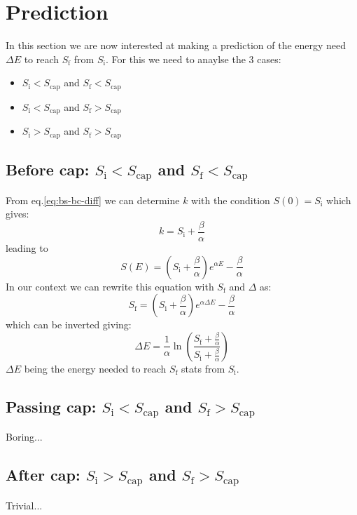 \documentclass[12pt]{article}
\def\Sc{S_\text{cap}}
\def\Si{S_\text{i}}
\def\Sf{S_\text{f}}
\begin{document}
\section{Prediction}
In this section we are now interested at making a prediction of the energy need $\Delta E$ to reach $\Sf$ from $\Si$. For this we need to anaylse the 3 cases:
\begin{itemize}
    \item $\Si < \Sc$ and $\Sf < \Sc$
    \item $\Si < \Sc$ and $\Sf > \Sc$
    \item $\Si > \Sc$ and $\Sf > \Sc$
\end{itemize}
\subsection{Before cap: $\Si < \Sc$ and $\Sf < \Sc$}
From eq.\eqref{eq:bs-bc-diff} we can determine $k$ with the condition $S(0) = \Si$ which gives:
\begin{equation}
    k = \Si + \frac{\beta}{\alpha}
\end{equation}
leading to
\begin{equation}
    S(E) = \left(\Si + \frac{\beta}{\alpha}\right)e^{\alpha E} - \frac{\beta}{\alpha}
\end{equation}
In our context we can rewrite this equation with $\Sf$ and $\Delta$ as:
\begin{equation}
    \Sf = \left(\Si + \frac{\beta}{\alpha}\right)e^{\alpha \Delta E} - \frac{\beta}{\alpha}
\end{equation}
which can be inverted giving:
\begin{equation}
    \Delta E = \frac{1}{\alpha} \ln\left( \frac{\Sf + \frac{\beta}{\alpha}}{\Si + \frac{\beta}{\alpha}} \right)
\end{equation}
$\Delta E$ being the energy needed to reach $\Sf$ stats from $\Si$.

\subsection{Passing cap: $\Si < \Sc$ and $\Sf > \Sc$}
Boring...
\subsection{After cap: $\Si > \Sc$ and $\Sf > \Sc$}
Trivial...
\end{document}
